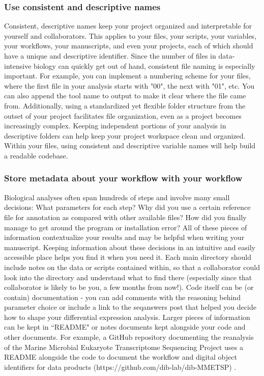 \documentclass[10pt,letterpaper]{article}
\begin{document}
\subsubsection*{Use consistent and descriptive names}  
Consistent, descriptive names keep your project organized and interpretable for yourself and collaborators. 
This applies to your files, your scripts, your variables, your workflows, your manuscripts, and even your projects, each of which should have a unique and descriptive identifier. 
Since the number of files in data-intensive biology can quickly get out of hand, consistent file naming is especially important. 
For example, you can implement a numbering scheme for your files, where the first file in your analysis starts with "00", the next with "01", etc. 
You can also append the tool name to output to make it clear where the file came from. 
Additionally, using a standardized yet flexible folder structure from the outset of your project facilitates file organization, even as a project becomes increasingly complex. 
Keeping independent portions of your analysis in descriptive folders can help keep your project workspace clean and organized.
Within your files, using consistent and descriptive variable names will help build a readable codebase.

\subsubsection*{Store metadata about your workflow with your workflow} 
Biological analyses often span hundreds of steps and involve many small decisions: What parameters for each step? 
Why did you use a certain reference file for annotation as compared with other available files? 
How did you finally manage to get around the program or installation error? 
All of these pieces of information contextualize your results and may be helpful when writing your manuscript. 
Keeping information about these decisions in an intuitive and easily accessible place helps you find it when you need it. 
Each main directory should include notes on the data or scripts contained within, so that a collaborator could look into the directory and understand what to find there (especially since that collaborator is likely to be you, a few months from now!).
Code itself can be (or contain) documentation - you can add comments with the reasoning behind parameter choice or include a link to the seqanswers post that helped you decide how to shape your differential expression analysis. 
Larger pieces of information can be kept in ``README" or notes documents kept alongside your code and other documents. 
For example, a GitHub repository documenting the reanalysis of the Marine Microbial Eukaryote Transcriptome Sequencing Project uses a README alongside the code to document the workflow and digital object identifiers for data products (https://github.com/dib-lab/dib-MMETSP) \cite{johnson2019}.   
\end{document}
